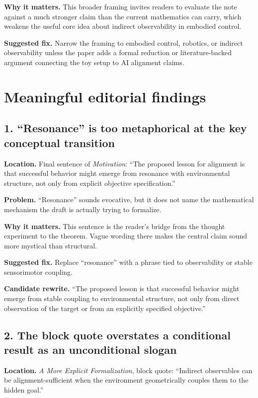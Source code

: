 \documentclass[11pt]{article}
\begin{document}
\textbf{Why it matters.} This broader framing invites readers to evaluate the note against a much stronger claim than the current mathematics can carry, which weakens the useful core idea about indirect observability in embodied control.

\textbf{Suggested fix.} Narrow the framing to embodied control, robotics, or indirect observability unless the paper adds a formal reduction or literature-backed argument connecting the toy setup to AI alignment claims.

\section*{Meaningful editorial findings}

\subsection*{1. ``Resonance'' is too metaphorical at the key conceptual transition}

\textbf{Location.} Final sentence of \emph{Motivation}: ``The proposed lesson for alignment is that successful behavior might emerge from resonance with environmental structure, not only from explicit objective specification.''

\textbf{Problem.} ``Resonance'' sounds evocative, but it does not name the mathematical mechanism the draft is actually trying to formalize.

\textbf{Why it matters.} This sentence is the reader's bridge from the thought experiment to the theorem. Vague wording there makes the central claim sound more mystical than structural.

\textbf{Suggested fix.} Replace ``resonance'' with a phrase tied to observability or stable sensorimotor coupling.

\textbf{Candidate rewrite.} ``The proposed lesson is that successful behavior might emerge from stable coupling to environmental structure, not only from direct observation of the target or from an explicitly specified objective.''

\subsection*{2. The block quote overstates a conditional result as an unconditional slogan}

\textbf{Location.} \emph{A More Explicit Formalization}, block quote: ``Indirect observables can be alignment-sufficient when the environment geometrically couples them to the hidden goal.''
\end{document}
